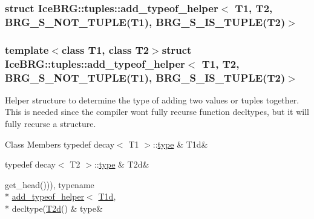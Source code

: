 \subsubsection{struct Ice\+B\+R\+G\+:\+:tuples\+:\+:add\+\_\+typeof\+\_\+helper$<$ T1, T2, B\+R\+G\+\_\+\+S\+\_\+\+N\+O\+T\+\_\+\+T\+U\+P\+L\+E(T1), B\+R\+G\+\_\+\+S\+\_\+\+I\+S\+\_\+\+T\+U\+P\+L\+E(T2)$>$}
\subsubsection*{template$<$class T1, class T2$>$struct Ice\+B\+R\+G\+::tuples\+::add\+\_\+typeof\+\_\+helper$<$ T1, T2, B\+R\+G\+\_\+\+S\+\_\+\+N\+O\+T\+\_\+\+T\+U\+P\+L\+E(\+T1), B\+R\+G\+\_\+\+S\+\_\+\+I\+S\+\_\+\+T\+U\+P\+L\+E(\+T2)$>$}

Helper structure to determine the type of adding two values or tuples together. This is needed since the compiler won\textquotesingle{}t fully recurse function decltypes, but it will fully recurse a structure. \begin{DoxyFields}{Class Members}
\hypertarget{namespaceIceBRG_1_1tuples_a4fb70245108f8c14684768b4f2ffbd5f}{}typedef decay$<$ T1 $>$\+::\hyperlink{namespaceIceBRG_1_1tuples_ad09c1743911cee7306fca7eeacb88b1d}{type}\label{namespaceIceBRG_1_1tuples_a4fb70245108f8c14684768b4f2ffbd5f}
&
T1d&
\\
\hline

\hypertarget{namespaceIceBRG_1_1tuples_a21e6c1a62f0b8388537f27edac9cedd6}{}typedef decay$<$ T2 $>$\+::\hyperlink{namespaceIceBRG_1_1tuples_ad09c1743911cee7306fca7eeacb88b1d}{type}\label{namespaceIceBRG_1_1tuples_a21e6c1a62f0b8388537f27edac9cedd6}
&
T2d&
\\
\hline

\hypertarget{namespaceIceBRG_1_1tuples_ad09c1743911cee7306fca7eeacb88b1d}{}get\+\_\+head())), typename \\*
\hyperlink{namespaceIceBRG_1_1tuples_structIceBRG_1_1tuples_1_1add__typeof__helper}{add\+\_\+typeof\+\_\+helper}$<$ \hyperlink{namespaceIceBRG_1_1tuples_a4fb70245108f8c14684768b4f2ffbd5f}{T1d}, \\*
decltype(\hyperlink{namespaceIceBRG_1_1tuples_a21e6c1a62f0b8388537f27edac9cedd6}{T2d}()\label{namespaceIceBRG_1_1tuples_ad09c1743911cee7306fca7eeacb88b1d}
&
type&
\\
\hline

\end{DoxyFields}
\label{structIceBRG_1_1tuples_1_1asct__typeof__helper}
\hypertarget{namespaceIceBRG_1_1tuples_structIceBRG_1_1tuples_1_1asct__typeof__helper}{}
